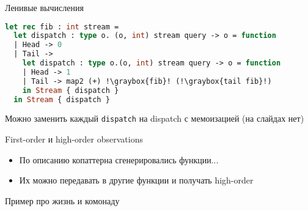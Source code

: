\documentclass[10pt, mathserif]{beamer}
\newcommand{\graybox}[1]{\colorbox{light-gray}{#1}}
\theoremstyle{definition}
\begin{document}
\begin{frame}[fragile]{Ленивые вычисления}
\begin{lstlisting}[language=ocaml]
let rec fib : int stream =
  let dispatch : type o. (o, int) stream query -> o = function
  | Head -> 0
  | Tail ->
    let dispatch : type o.(o, int) stream query -> o = function
    | Head -> 1
    | Tail -> map2 (+) !\graybox{fib}! (!\graybox{tail fib}!)
    in Stream { dispatch }
  in Stream { dispatch }
\end{lstlisting}

Можно заменить каждый \lstinline=dispatch= на dispatch с мемоизацией (на слайдах нет)
\end{frame}

\begin{frame}[fragile]{First-order и high-order observations}
\begin{itemize}
 \item По описанию копаттерна сгенерировались функции...
 \item Их можно передавать в другие функции и получать high-order
\end{itemize}
\end{frame}

\begin{frame}[fragile]{Пример про жизнь и комонаду}
$ $
\end{frame}
\end{document}
